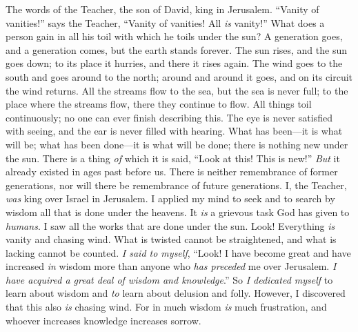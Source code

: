 
\begin{biblechapter} %
 The words of the Teacher, the son of David, king in Jerusalem.
 “Vanity of vanities!” says the Teacher, 
“Vanity of vanities! All \textit{is} vanity!”
 What does a person gain in all his toil 
with which he toils under the sun?
\verse A generation goes, and a generation comes, 
but the earth stands forever.
\verse The sun rises, and the sun goes down; 
to its place it hurries, and there it rises again.
\verse The wind goes to the south and goes around to the north; 
around and around it goes, and on its circuit the wind returns.
\verse All the streams flow to the sea, 
but the sea is never full; 
to the place where the streams flow, 
there they continue to flow.
\verse All things toil continuously; 
no one can ever finish describing this. 
The eye is never satisfied with seeing, 
and the ear is never filled with hearing.
\verse What has been—it is what will be; 
what has been done—it is what will be done; 
there is nothing new under the sun.
\verse There is a thing \textit{of} which it is said, “Look at this! This is new!” 
\textit{But} it already existed in ages past before us.
\verse There is neither remembrance of former generations, 
nor will there be remembrance of future generations.
 I, the Teacher, \textit{was} king over Israel in Jerusalem.
\verse I applied my mind to seek and to search by wisdom all that is done under the heavens. It \textit{is} a grievous task God has given to \textit{humans}.
\verse I saw all the works that are done under the sun. Look! Everything \textit{is} vanity and chasing wind.
\verse What is twisted cannot be straightened, 
and what is lacking cannot be counted.
\verse \textit{I said to myself}, “Look! I have become great and have increased \textit{in} wisdom more than anyone who \textit{has preceded} me over Jerusalem. \textit{I have acquired a great deal of wisdom and knowledge}.”
\verse So \textit{I dedicated myself} to learn about wisdom and \textit{to} learn about delusion and folly. However, I discovered that this also \textit{is} chasing wind.
\verse For in much wisdom \textit{is} much frustration, 
and whoever increases knowledge increases sorrow.
\end{biblechapter}

